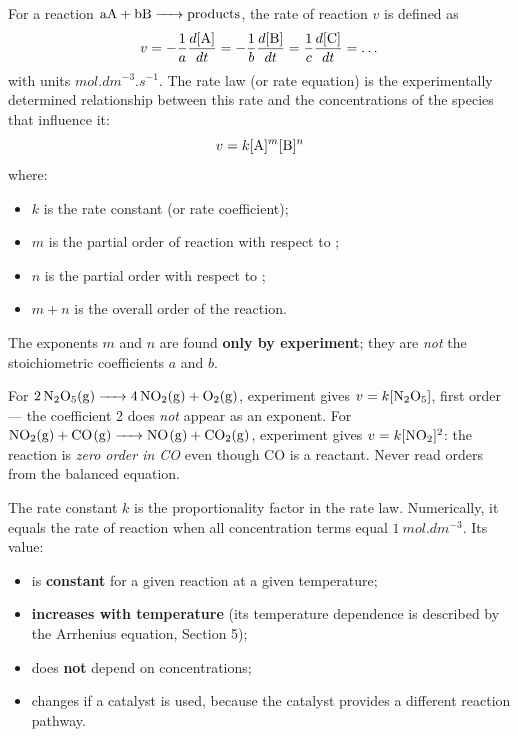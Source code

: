 \documentclass[11pt]{article}
\newcommand{\cle}[1]{{\popxbold\color{popdark}#1}}
\begin{document}
\begin{definition}
For a reaction $\ce{aA + bB -> products}$, the \cle{rate of reaction} $v$ is defined as
\[
v = -\frac{1}{a}\frac{d[\ce{A}]}{dt} = -\frac{1}{b}\frac{d[\ce{B}]}{dt} = \frac{1}{c}\frac{d[\ce{C}]}{dt} = \dots
\]
with units $\si{mol.dm^{-3}.s^{-1}}$. The \cle{rate law} (or \cle{rate equation}) is the experimentally determined relationship between this rate and the concentrations of the species that influence it:
\[
v = k[\ce{A}]^{m}[\ce{B}]^{n}
\]
where:
\begin{itemize}
\item $k$ is the \cle{rate constant} (or rate coefficient);
\item $m$ is the \cle{partial order} of reaction with respect to ;
\item $n$ is the partial order with respect to ;
\item $m + n$ is the \cle{overall order} of the reaction.
\end{itemize}
The exponents $m$ and $n$ are found \textbf{only by experiment}; they are \emph{not} the stoichiometric coefficients $a$ and $b$.
\end{definition}

\begin{attention}
For $\ce{2N2O5(g) -> 4NO2(g) + O2(g)}$, experiment gives $v = k[\ce{N2O5}]$, first order --- the coefficient 2 does \emph{not} appear as an exponent. For $\ce{NO2(g) + CO(g) -> NO(g) + CO2(g)}$, experiment gives $v = k[\ce{NO2}]^2$: the reaction is \emph{zero order in CO} even though CO is a reactant. Never read orders from the balanced equation.
\end{attention}

\begin{definition}
The \cle{rate constant} $k$ is the proportionality factor in the rate law. Numerically, it equals the rate of reaction when all concentration terms equal $\SI{1}{mol.dm^{-3}}$. Its value:
\begin{itemize}
\item is \textbf{constant} for a given reaction at a given temperature;
\item \textbf{increases with temperature} (its temperature dependence is described by the Arrhenius equation, Section 5);
\item does \textbf{not} depend on concentrations;
\item changes if a catalyst is used, because the catalyst provides a different reaction pathway.
\end{itemize}
\end{definition}
\end{document}
